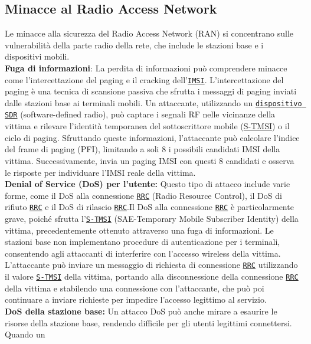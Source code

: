\documentclass[english]{article}
\begin{document}
\subsection{Minacce al Radio Access Network}
Le minacce alla sicurezza del Radio Access Network (RAN) si concentrano sulle
vulnerabilità della parte radio della rete, che include le stazioni base e i
dispositivi mobili. \\[0.2cm]
\textbf{Fuga di informazioni}:
La perdita di informazioni può comprendere minacce come l'intercettazione del
paging e il cracking dell'\texttt{\hyperlink{IMSI}{IMSI}}. L'intercettazione
del paging è una tecnica di scansione passiva che sfrutta i messaggi di paging
inviati dalle stazioni base ai terminali mobili. Un attaccante, utilizzando un
\texttt{\hyperlink{SDR}{dispositivo SDR}} (software-defined radio), può captare
i segnali RF nelle vicinanze della vittima e rilevare l'identità temporanea del
sottoscrittore mobile (\hyperlink{S-TMSI}{S-TMSI}) o il ciclo di paging.
Sfruttando queste informazioni, l'attaccante può calcolare l'indice del frame di
paging (PFI), limitando a soli 8 i possibili candidati IMSI della vittima. Successivamente,
invia un paging IMSI con questi 8 candidati e osserva le risposte per individuare
l'IMSI reale della vittima.
\\[0.2cm]
\textbf{Denial of Service (DoS) per l'utente:} Questo tipo di attacco include varie
forme, come il DoS alla connessione \texttt{\hyperlink{RRC}{RRC}} (Radio Resource
Control), il DoS di rifiuto \texttt{\hyperlink{RRC}{RRC}} e il DoS di rilascio
\texttt{\hyperlink{RRC}{RRC}}.\@ Il DoS alla connessione \texttt{\hyperlink{RRC}{RRC}}
è particolarmente grave, poiché sfrutta l'\texttt{\hyperlink{S-TMSI}{S-TMSI}}
(SAE-Temporary Mobile Subscriber Identity) della vittima, precedentemente ottenuto
attraverso una fuga di informazioni. Le stazioni base non implementano procedure di
autenticazione per i terminali, consentendo agli attaccanti di interferire con
l'accesso wireless della vittima. L'attaccante può inviare un messaggio di richiesta
di connessione \texttt{\hyperlink{RRC}{RRC}} utilizzando il valore \texttt{\hyperlink{S-TMSI}{S-TMSI}}
della vittima, portando alla disconnessione della connessione \texttt{\hyperlink{RRC}{RRC}}
della vittima e stabilendo una connessione con l'attaccante, che può poi continuare a
inviare richieste per impedire l'accesso legittimo al servizio.
\\[0.2cm]
\textbf{DoS della stazione base:} Un attacco DoS può anche mirare a esaurire le risorse
della stazione base, rendendo difficile per gli utenti legittimi connettersi. Quando un
\end{document}
